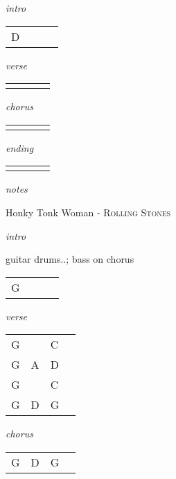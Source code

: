 \documentclass[12pt]{article}
\begin{document}
\huge
\textit{intro}

\begin{tabular}{|P{1.25in}|P{1.25in}|P{1.25in}|P{1.25in}|}
  D &   &   &   \\
\end{tabular}

\textit{verse}

\begin{tabular}{|P{1.25in}|P{1.25in}|P{1.25in}|P{1.25in}|}
    &   &   &   \\
\end{tabular}

\textit{chorus}

\begin{tabular}{|P{1.25in}|P{1.25in}|P{1.25in}|P{1.25in}|}
    &   &   &   \\
\end{tabular}

\textit{ending}

\begin{tabular}{|P{1.25in}|P{1.25in}|P{1.25in}|P{1.25in}|}
    &   &   &   \\
\end{tabular}

\textit{notes}

\newpage

{\Huge Honky Tonk Woman} {\huge - \textsc{Rolling Stones}}

\huge
\textit{intro}

guitar drums..; bass on chorus

\begin{tabular}{|P{1.25in}|P{1.25in}|P{1.25in}|P{1.25in}|}
  G &   &   &   \\
\end{tabular}

\textit{verse}

\begin{tabular}{|P{1.25in}|P{1.25in}|P{1.25in}|P{1.25in}|}
  G &   & C  &   \\
  G & A  &  D &   \\
  G &   & C  &   \\
  G & D & G  &   \\
\end{tabular}

\textit{chorus}

\begin{tabular}{|P{1.25in}|P{1.25in}|P{1.25in}|P{1.25in}|}
  G &  D & G  &   \\
\end{tabular}
\end{document}
